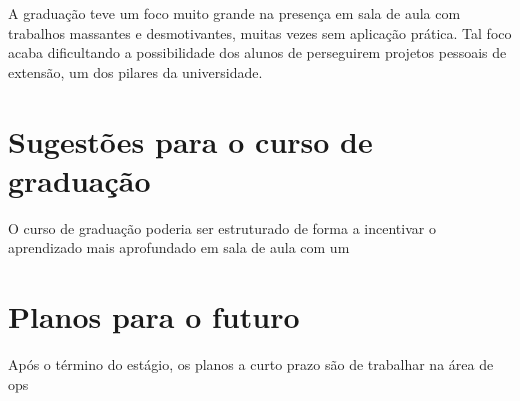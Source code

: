 A graduação teve um foco muito grande na presença em sala de aula com trabalhos massantes e desmotivantes, muitas vezes sem aplicação prática. Tal foco acaba dificultando a possibilidade dos alunos de perseguirem projetos pessoais de extensão, um dos pilares da universidade.\\

%

\section{Sugestões para o curso de graduação}


O curso de graduação poderia ser estruturado de forma a incentivar o aprendizado mais aprofundado em sala de aula com um

\section{Planos para o futuro}


Após o término do estágio, os planos a curto prazo são de trabalhar na área de \gls{ops}
